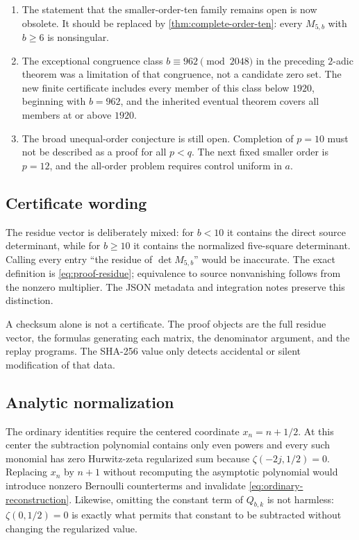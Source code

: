 \documentclass[11pt]{article}
\theoremstyle{definition}
\begin{document}
\begin{enumerate}[label=\textbf{A\arabic*.}]
\item The statement that the smaller-order-ten family remains open is
now obsolete.  It should be replaced by
\cref{thm:complete-order-ten}: every $M_{5,b}$ with $b\ge6$ is
nonsingular.

\item The exceptional congruence class
$b\equiv962\pmod{2048}$ in the preceding $2$-adic theorem was a
limitation of that congruence, not a candidate zero set.  The new finite
certificate includes every member of this class below $1920$, beginning
with $b=962$, and the inherited eventual theorem covers all members at
or above $1920$.

\item The broad unequal-order conjecture is still open.  Completion of
$p=10$ must not be described as a proof for all $p<q$.  The next fixed
smaller order is $p=12$, and the all-order problem requires control
uniform in $a$.
\end{enumerate}

\subsection{Certificate wording}

The residue vector is deliberately mixed: for $b<10$ it contains the
direct source determinant, while for $b\ge10$ it contains the normalized
five-square determinant.  Calling every entry ``the residue of
$\det M_{5,b}$'' would be inaccurate.  The exact definition is
\eqref{eq:proof-residue}; equivalence to source nonvanishing follows
from the nonzero multiplier.  The JSON metadata and integration notes
preserve this distinction.

A checksum alone is not a certificate.  The proof objects are the full
residue vector, the formulas generating each matrix, the denominator
argument, and the replay programs.  The SHA-256 value only detects
accidental or silent modification of that data.

\subsection{Analytic normalization}

The ordinary identities require the centered coordinate
$x_n=n+1/2$.  At this center the subtraction polynomial contains only
even powers and every such monomial has zero Hurwitz-zeta regularized
sum because $\zeta(-2j,1/2)=0$.  Replacing $x_n$ by $n+1$ without
recomputing the asymptotic polynomial would introduce nonzero Bernoulli
counterterms and invalidate \eqref{eq:ordinary-reconstruction}.
Likewise, omitting the constant term of $Q_{b,k}$ is not harmless:
$\zeta(0,1/2)=0$ is exactly what permits that constant to be subtracted
without changing the regularized value.
\end{document}
